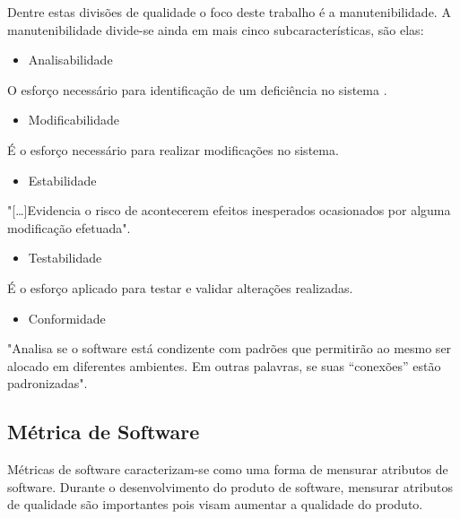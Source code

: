 Dentre estas divisões de qualidade o foco deste trabalho é a manutenibilidade. A manutenibilidade divide-se ainda em mais cinco subcaracterísticas, são elas:
\begin{itemize}
\item Analisabilidade
\end{itemize}
O esforço necessário para identificação de um deficiência no sistema \cite{isaias2012}.
\begin{itemize}
\item Modificabilidade
\end{itemize}
É o esforço necessário para realizar modificações no sistema.
\begin{itemize}
\item Estabilidade
\end{itemize}
"[\ldots]Evidencia  o  risco  de  acontecerem  efeitos inesperados ocasionados por alguma modificação efetuada"\space \cite[p.~29]{isaias2012}.
\begin{itemize}
\item Testabilidade
\end{itemize}
É o esforço aplicado para testar e validar alterações realizadas.
\begin{itemize}
\item Conformidade
\end{itemize}
"Analisa  se  o  software  está  condizente  com 
padrões  que  permitirão  ao  mesmo  ser  alocado  em  diferentes ambientes.  Em  outras  palavras,  se  suas  “conexões”  estão padronizadas"\space \cite[p.~29]{isaias2012}.

\subsection{Métrica de Software}
Métricas de software caracterizam-se como uma forma de mensurar atributos de software. Durante o desenvolvimento do produto de software, mensurar atributos de qualidade são importantes pois visam aumentar a qualidade do produto.

